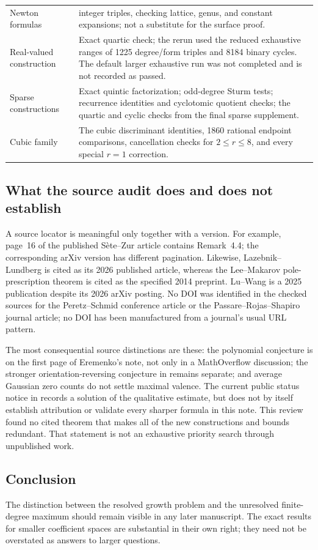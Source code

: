 \documentclass[UTF8,11pt]{ctexart}
\theoremstyle{definition}
\numberwithin{equation}{section}
\begin{document}
\begin{longtable}{@{}>{\raggedright\arraybackslash}p{}>{\raggedright\arraybackslash}p{}@{}}
Newton formulas & 7006 integer triples, checking lattice, genus, and constant expansions; not a substitute for the surface proof. \\
Real-valued construction & Exact quartic check; the rerun used the reduced exhaustive ranges of 1225 degree/form triples and 8184 binary cycles. The default larger exhaustive run was not completed and is not recorded as passed. \\
Sparse constructions & Exact quintic factorization; odd-degree Sturm tests; recurrence identities and cyclotomic quotient checks; the quartic and cyclic checks from the final sparse supplement. \\
Cubic family & The cubic discriminant identities, 1860 rational endpoint comparisons, cancellation checks for $2\le r\le8$, and every special $r=1$ correction. \\
\bottomrule
\end{longtable}

\subsection{What the source audit does and does not establish}
A source locator is meaningful only together with a version. For example,
page~16 of the published S\`ete--Zur article contains Remark~4.4; the
corresponding arXiv version has different pagination. Likewise,
Lazebnik--Lundberg is cited as its 2026 published article, whereas the
Lee--Makarov pole-prescription theorem is cited as the specified 2014
preprint. Lu--Wang is a 2025 publication despite its 2026 arXiv posting.
No DOI was identified in the checked sources for the Peretz--Schmid
conference article or the Passare--Rojas--Shapiro journal article; no DOI
has been manufactured from a journal's usual URL pattern.

The most consequential source distinctions are these: the polynomial
conjecture is on the first page of Eremenko's note, not only in a
MathOverflow discussion; the stronger orientation-reversing conjecture
in \cite{LLL15} remains separate; and average Gaussian zero counts do not
settle maximal valence. The current public status notice in \cite{Ere26b}
records a solution of the qualitative estimate, but does not by itself
establish attribution or validate every sharper formula in this note.
This review found no cited theorem that makes all of the new constructions
and bounds redundant. That statement is not an exhaustive priority search
through unpublished work.

\subsection{Conclusion}
The distinction between the resolved growth problem and the unresolved
finite-degree maximum should remain visible in any later manuscript.
The exact results for smaller coefficient spaces are substantial in their
own right; they need not be overstated as answers to larger questions.
\end{document}
